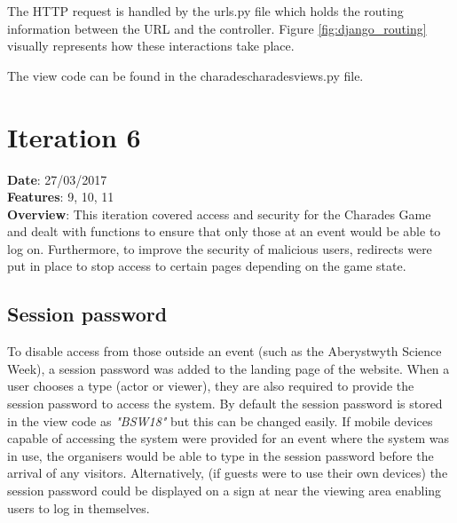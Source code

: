 The HTTP request is handled by the urls.py file which holds the routing information between the URL and the controller. Figure \ref{fig:django_routing} visually represents how these interactions take place.

The view code can be found in the charades\/charades\/views.py file.

\begin{figure}[h!]
\end{figure}


\newpage

\section{Iteration 6}
\textbf{Date}: 27/03/2017 \\
\textbf{Features}: 9, 10, 11 \\
\textbf{Overview}: This iteration covered access and security for the Charades Game and dealt with functions to ensure that only those at an event would be able to log on. Furthermore, to improve the security of malicious users, redirects were put in place to stop access to certain pages depending on the game state.

\subsection{Session password}
To disable access from those outside an event (such as the Aberystwyth Science Week), a session password was added to the landing page of the website. When a user chooses a type (actor or viewer), they are also required to provide the session password to access the system. By default the session password is stored in the view code as \textit{"BSW18"} but this can be changed easily. If mobile devices capable of accessing the system were provided for an event where the system was in use, the organisers would be able to type in the session password before the arrival of any visitors. Alternatively, (if guests were to use their own devices) the session password could be displayed on a sign at near the viewing area enabling users to log in themselves.

